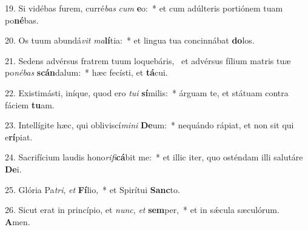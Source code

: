 19. Si vidébas furem, curré\textit{bas} \textit{cum} \textbf{e}o:~*  et cum adúlteris portiónem tuam po\textbf{né}bas.\

20. Os tuum abundá\textit{vit} \textit{ma}\textbf{lí}tia:~*  et lingua tua concinnábat \textbf{do}los.\

21. Sedens advérsus fratrem tuum loquebáris, \dag\  et advérsus fílium matris tuæ po\textit{né}\textit{bas} \textbf{scán}dalum:~*  hæc fecísti, et \textbf{tá}cui.\

22. Existimásti, iníque, quod ero \textit{tu}\textit{i} \textbf{sí}milis:~*  árguam te, et státuam contra fáciem \textbf{tu}am.\

23. Intellígite hæc, qui obliviscí\textit{mi}\textit{ni} \textbf{De}um:~*  nequándo rápiat, et non sit qui e\textbf{rí}piat.\

24. Sacrifícium laudis hono\textit{ri}\textit{fi}\textbf{cá}bit me:~*  et illic iter, quo osténdam illi salutáre \textbf{De}i.\

25. Glória Pa\textit{tri}, \textit{et} \textbf{Fí}lio,~*  et Spirítui \textbf{Sanc}to.\

26. Sicut erat in princípio, et \textit{nunc}, \textit{et} \textbf{sem}per,~*  et in sǽcula sæculórum. \textbf{A}men.\

